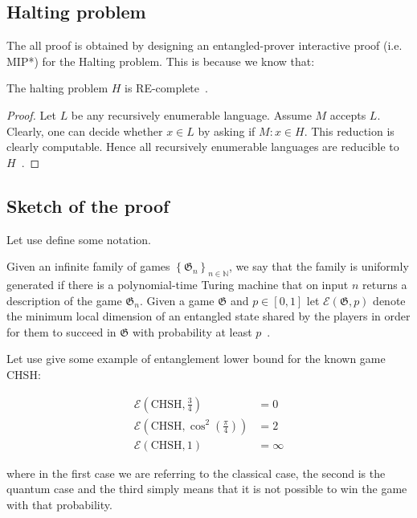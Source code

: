 
\subsection{Halting problem}
The all proof is obtained by designing an entangled-prover interactive proof (i.e. MIP*) for the Halting problem. This is because we know that:
\begin{theorem}
    The halting problem $H$ is RE-complete~\cite{Algorithms}.
\begin{proof}
    Let $L$ be any recursively enumerable language. Assume $M$ accepts $L$. Clearly, one can decide whether $x \in L$ by asking if $M: x \in H$. This reduction is clearly computable. Hence all recursively enumerable languages are reducible to $H$~\cite{Algorithms}.
\end{proof}
\end{theorem}

\subsection{Sketch of the proof}
Let use define some notation.
\begin{defn}
    Given an infinite family of games $\left\{\mathfrak{G}_{n}\right\}_{n \in \mathbb{N}}$, we say that the family is uniformly generated if there is a polynomial-time Turing machine that on input $n$ returns a description of the game $\mathfrak{G}_{n}$. Given a game $\mathfrak{G}$ and $p \in[0,1]$ let $\mathscr{E}(\mathfrak{G}, p)$ denote the minimum local dimension of an entangled state shared by the players in order for them to succeed in $\mathfrak{G}$ with probability at least $p$~\cite{mipre}.
\end{defn}



Let use give some example of entanglement lower bound for the known game CHSH:

\begin{align}
    \mathscr{E}\left(\text{CHSH}, \frac{3}{4}\right) &= 0 \\
    \mathscr{E}\left(\text{CHSH}, \cos^2\left({\frac{\pi}{4}}\right)\right) &= 2 \\
    \mathscr{E}(\text{CHSH}, 1) &= \infty
\end{align}

where in the first case we are referring to the classical case, the second is the quantum case and the third simply means that it is not possible to win the game with that probability.



